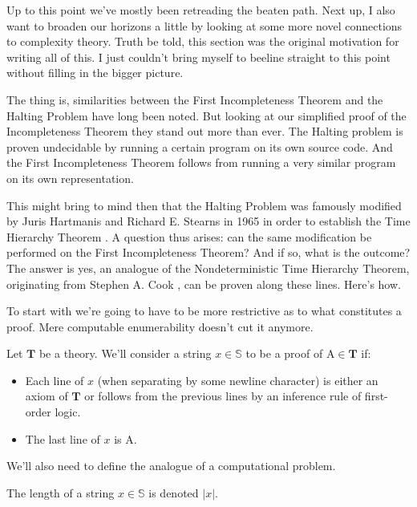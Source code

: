 \documentclass{article}
\theoremstyle{customstyle}
\newcommand{\T}{\mathbf{T}}
\begin{document}
Up to this point we've mostly been retreading the beaten path. Next up, I also want to broaden our horizons a little by looking at some more novel connections to complexity theory. Truth be told, this section was the original motivation for writing all of this. I just couldn't bring myself to beeline straight to this point without filling in the bigger picture.

The thing is, similarities between the First Incompleteness Theorem and the Halting Problem have long been noted. But looking at our simplified proof of the Incompleteness Theorem they stand out more than ever. The Halting problem is proven undecidable by running a certain program on its own source code. And the First Incompleteness Theorem follows from running a very similar program on its own representation.

This might bring to mind then that the Halting Problem was famously modified by Juris Hartmanis and Richard E. Stearns in 1965 in order to establish the Time Hierarchy Theorem \cite{time-hierarchy}. A question thus arises: can the same modification be performed on the First Incompleteness Theorem? And if so, what is the outcome? The answer is yes, an analogue of the Nondeterministic Time Hierarchy Theorem, originating from Stephen A. Cook \cite{cook}, can be proven along these lines. Here's how.

To start with we're going to have to be more restrictive as to what constitutes a proof. Mere computable enumerability doesn't cut it anymore.

\begin{definition}[Proof]
Let $\T$ be a theory. We'll consider a string $x \in \mathbb{S}$ to be a proof of $\mathrm{A} \in \T$ if:
\begin{itemize}
\item Each line of $x$ (when separating by some newline character) is either an axiom of $\T$ or follows from the previous lines by an inference rule of first-order logic.
\item The last line of $x$ is $\mathrm{A}$.
\end{itemize}
\end{definition}

We'll also need to define the analogue of a computational problem.

\begin{definition}
The length of a string $x \in \mathbb{S}$ is denoted $\lvert x \rvert$.
\end{definition}
\end{document}
